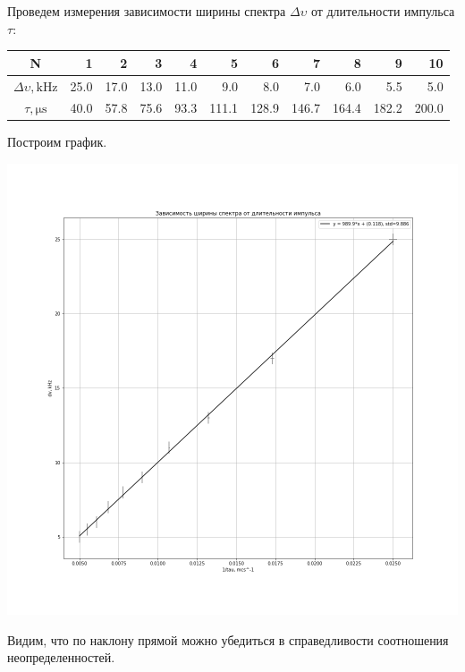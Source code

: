 \documentclass[12pt,a4paper]{article}
\begin{document}
        \newpage
        Проведем измерения зависимости ширины спектра $\Delta \upsilon$ от длительности импульса $\tau$:
        
        \begin{center}
            \begin{tabular}{|c|r|r|r|r|r|r|r|r|r|r|}
            \hline
                 N  &   1   &   2   &   3   &   4   &   5   &   6   &   7   &   8   &   9   &   10                      \\ \hline
                 $\Delta \upsilon, \si{\kilo\hertz}$ & 25.0 & 17.0 & 13.0 & 11.0 & 9.0 & 8.0 & 7.0 & 6.0 & 5.5 & 5.0    \\ \hline
                 $\tau, \si{\micro\second}$ & 40.0 & 57.8 & 75.6 & 93.3 & 111.1 & 128.9 & 146.7 & 164.4 & 182.2 & 200.0 \\ \hline
            \end{tabular}
        \end{center}

        Построим график.
        \begin{center}
            \includegraphics[width=\linewidth]{img/1.png}
        \end{center}
        
        Видим, что по наклону прямой можно убедиться в справедливости соотношения неопределенностей.
    
\end{document}
